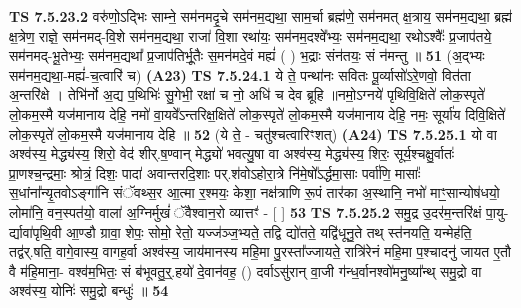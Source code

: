 \documentclass[17pt]{extarticle}
\begin{document}
                  \newline
                                \textbf{ TS 7.5.23.2} \newline
                  वरु॑णो॒ऽद्भिः साम्ने॒ सम॑नमदृ॒चे सम॑नम॒द्यथा॒ साम॒र्चा ब्रह्म॑णे॒ सम॑नमत् क्ष॒त्राय॒ सम॑नम॒द्यथा॒ ब्रह्म॑ क्ष॒त्रेण॒ राज्ञे॒ सम॑नमद्-वि॒शे सम॑नम॒द्यथा॒ राजा॑ वि॒शा रथा॑यः॒ सम॑नम॒दश्वे᳚भ्यः॒ सम॑नम॒द्यथा॒ रथोऽश्वैः᳚ प्र॒जाप॑तये॒ सम॑नमद्-भू॒तेभ्यः॒ सम॑नम॒द्यथा᳚ प्र॒जाप॑तिर्भू॒तैः स॒मन॑मदे॒वं मह्यं॑ ( ) भ॒द्राः संन॑तयः॒ सं न॑मन्तु ॥ \textbf{  51} \newline
                  \newline
                      (अ॒द्भ्यः सम॑नम॒द्यथा॒-मह्यं॑-च॒त्वारि॑ च)  \textbf{(A23)} \newline \newline
                                        \textbf{ TS 7.5.24.1} \newline
                  ये ते॒ पन्था॑नः सवितः पू॒र्व्यासो॑ऽरे॒णवो॒ वित॑ता अ॒न्तरि॑क्षे । तेभि॑र्नो अ॒द्य प॒थिभिः॑ सु॒गेभी॒ रक्षा॑ च नो॒ अधि॑ च देव ब्रूहि ॥नमो॒ऽग्नये॑ पृथिवि॒क्षिते॑ लोक॒स्पृते॑ लो॒कम॒स्मै यज॑मानाय देहि॒ नमो॑ वा॒यवे᳚ऽन्तरिक्ष॒क्षिते॑ लोक॒स्पृते॑ लो॒कम॒स्मै यज॑मानाय देहि॒ नमः॒ सूर्या॑य दिवि॒क्षिते॑ लोक॒स्पृते॑ लो॒कम॒स्मै यज॑मानाय देहि ॥ \textbf{  52} \newline
                  \newline
                      (ये ते॒ - चतु॑श्चत्वारिꣳशत्)  \textbf{(A24)} \newline \newline
                                        \textbf{ TS 7.5.25.1} \newline
                  यो वा अश्व॑स्य॒ मेद्ध्य॑स्य॒ शिरो॒ वेद॑ शीर्.ष॒ण्वान् मेद्ध्यो॑ भवत्यु॒षा वा अश्व॑स्य॒ मेद्ध्य॑स्य॒ शिरः॒ सूर्य॒श्चक्षु॒र्वातः॑ प्रा॒णश्च॒न्द्रमाः॒ श्रोत्रं॒ दिशः॒ पादा॑ अवान्तरदि॒शाः पर्.श॑वोऽहोरा॒त्रे नि॑मे॒षो᳚ऽर्द्धमा॒साः पर्वा॑णि॒ मासाः᳚ स॒धांना᳚न्यृ॒तवोऽङ्गा॑नि संॅवथ्स॒र आ॒त्मा र॒श्मयः॒ केशा॒ नक्ष॑त्राणि रू॒पं तार॑का अ॒स्थानि॒ नभो॑ माꣳ॒॒सान्योष॑धयो॒ लोमा॑नि॒ वन॒स्पत॑यो॒ वाला॑ अ॒ग्निर्मुखं॑ ॅवैश्वान॒रो व्यात्तꣳ॑ - [  ] \textbf{  53} \newline
                  \newline
                                \textbf{ TS 7.5.25.2} \newline
                  समु॒द्र उ॒दर॑म॒न्तरि॑क्षं पा॒यु-र्द्यावा॑पृथि॒वी आ॒ण्डौ ग्रावा॒ शेपः॒ सोमो॒ रेतो॒ यज्ज॑ञ्ज॒भ्यते॒ तद्वि द्यो॑तते॒ यद्वि॑धूनु॒ते तथ् स्त॑नयति॒ यन्मेह॑ति॒ तद्व॑र्.षति॒ वागे॒वास्य॒ वागह॒र्वा अश्व॑स्य॒ जाय॑मानस्य महि॒मा पु॒रस्ता᳚ज्जायते॒ रात्रि॑रेनं महि॒मा प॒श्चादनु॑ जायत ए॒तौ वै म॑हि॒माना॒- वश्व॑म॒भितः॒ सं ब॑भूवतु॒र्॒.हयो॑ दे॒वान॑वह॒ () दर्वाऽसु॑रान् वा॒जी ग॑न्ध॒र्वानश्वो॑मनु॒ष्या᳚न्थ् समु॒द्रो वा अश्व॑स्य॒ योनिः॑ समु॒द्रो बन्धुः॑ ॥ \textbf{  54} \newline
\end{document}
